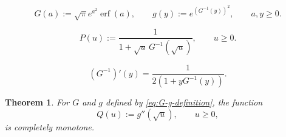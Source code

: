 \documentclass[10pt,a4paper]{amsart}
\newtheorem{theorem}{Theorem}
\newcommand{\erf}{\operatorname{erf}}
\begin{document}
\begin{equation}\label{eq:G-g-definition}
 G(a):=\sqrt\pi e^{a^2}\erf(a),
 \qquad g(y):=e^{(G^{-1}(y))^2},
 \qquad a,y\geq0.
\end{equation}

\begin{equation}\label{eq:P-definition}
 P(u):=\frac1{1+\sqrt u\,G^{-1}(\sqrt u)},
 \qquad u\geq0.
\end{equation}

\begin{equation}\label{eq:G-inverse-ODE}
 (G^{-1})'(y)=\frac1{2(1+yG^{-1}(y))}.
\end{equation}

\begin{theorem}\label{thm:complete-monotonicity}
For $G$ and $g$ defined by \eqref{eq:G-g-definition}, the function
\begin{equation}\label{eq:Q-definition}
 Q(u):=g''(\sqrt u),\qquad u\geq0,
\end{equation}
is completely monotone.
\end{theorem}
\end{document}
